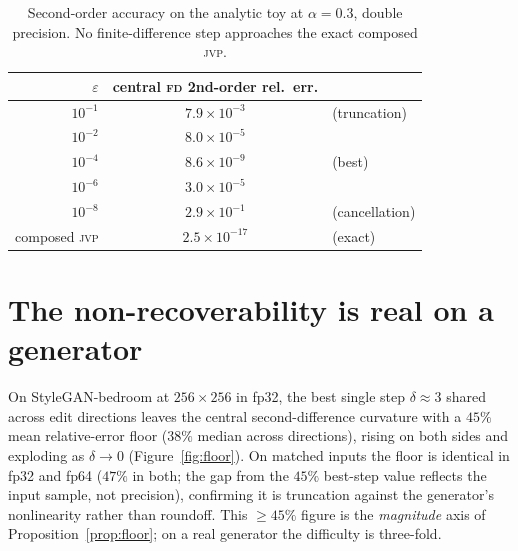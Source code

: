\documentclass[10pt]{article}
\newcommand{\jvp}{\textsc{jvp}}
\newcommand{\fd}{\textsc{fd}}
\newcommand{\eps}{\varepsilon}
\begin{document}
\begin{table}[h]\centering
\begin{tabular}{rcl}
\toprule
$\eps$ & central \fd{} 2nd-order rel.\ err. & \\
\midrule
$10^{-1}$ & $7.9\times10^{-3}$ & (truncation) \\
$10^{-2}$ & $8.0\times10^{-5}$ & \\
$10^{-4}$ & $8.6\times10^{-9}$ & (best) \\
$10^{-6}$ & $3.0\times10^{-5}$ & \\
$10^{-8}$ & $2.9\times10^{-1}$ & (cancellation) \\
\midrule
composed \jvp & $2.5\times10^{-17}$ & (exact) \\
\bottomrule
\end{tabular}
\caption{Second-order accuracy on the analytic toy at $\alpha=0.3$, double precision. No
finite-difference step approaches the exact composed \jvp{}.}
\label{tab:toy}
\end{table}

\section{The non-recoverability is real on a generator}
\label{sec:real}
On StyleGAN-bedroom at $256{\times}256$ in fp32, the best single step $\delta\!\approx\!3$ shared across
edit directions leaves the central second-difference curvature with a $45\%$ mean relative-error floor
($38\%$ median across directions), rising on both sides and exploding as $\delta\to0$
(Figure~\ref{fig:floor}). On matched inputs the floor is identical in fp32 and fp64 ($47\%$ in both; the
gap from the $45\%$ best-step value reflects the input sample, not precision), confirming it is truncation
against the generator's nonlinearity rather than roundoff. This $\geq45\%$ figure is the \emph{magnitude}
axis of Proposition~\ref{prop:floor}; on a real generator the difficulty is three-fold.
\end{document}
